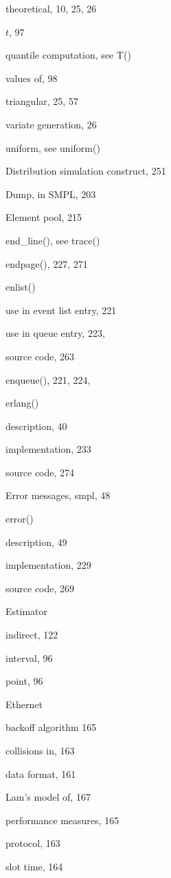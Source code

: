 \qquad theoretical, 10, 25, 26\par
\quad $t$, 97\par
\qquad quantile computation, see T()\par
\qquad values of, 98\par
\quad triangular, 25, 57\par
\qquad variate generation, 26\par
\quad uniform, see uniform()\par
\noindent Distribution simulation construct, 251\par
\noindent Dump, in SMPL, 203\par
\noindent Element pool, 215\par
\noindent end\_line(), see trace()\par
\noindent endpage(), 227, 271\par
\noindent enlist()\par
\quad use in event list entry, 221\par
\quad use in queue entry, 223,\par
\quad source code, 263\par
\noindent enqueue(), 221, 224,\par
\noindent erlang()\par
\quad description, 40\par
\quad implementation, 233\par
\quad source code, 274\par
\noindent Error messages, smpl, 48\par
\noindent error()\par
\quad description, 49\par
\quad implementation, 229\par
\quad source code, 269\par
\noindent Estimator\par
\quad indirect, 122\par
\quad interval, 96\par
\quad point, 96\par
\noindent Ethernet\par
\quad backoff algorithm 165\par
\quad collisions in, 163\par
\quad data format, 161\par
\quad Lam's model of, 167\par
\quad performance measures, 165\par
\quad protocol, 163\par
\quad slot time, 164\par

